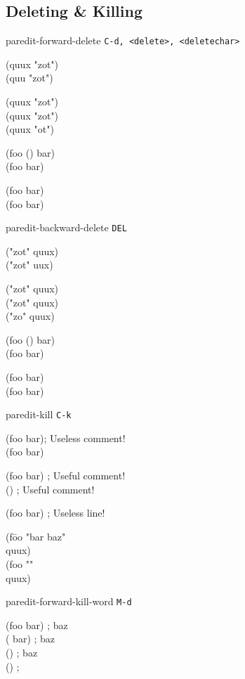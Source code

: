 \documentclass[8pt,landscape,a4paper]{article}
\newenvironment{nstabbing}
  {\setlength{\topsep}{-\parskip}%
   \setlength{\partopsep}{0.2em}%
   \tabbing}
  {\endtabbing}
\begin{document}
\begin{multicols}{4}
    \section*{Deleting \& Killing}

paredit-forward-delete \texttt{C-d, <delete>, <deletechar>}

{\ttfamily
(quu\cursor{}x "zot")\\
(quu\cursor{} "zot")

(quux \cursor"zot")\\
(quux "\cursor zot")\\
(quux "\cursor ot")

(foo (\cursor) bar)\\
(foo \cursor{} bar)

\cursor(foo bar)\\
(\cursor foo bar)
}

paredit-backward-delete \texttt{DEL}

{\ttfamily
("zot" q\cursor uux)\\
("zot" \cursor uux)

("zot"\cursor{} quux)\\
("zot\cursor" quux)\\
("zo\cursor" quux)

(foo (\cursor) bar)\\
(foo \cursor{} bar)

(foo bar)\cursor\\
(foo bar\cursor)
}

paredit-kill \texttt{C-k}

{\ttfamily
(foo bar)\cursor \space \space \space ; Useless comment!\\
(foo bar)\cursor

(\cursor foo bar) \space \space \space ; Useful comment!\\
(\cursor) \space \space \space ; Useful comment!

\cursor(foo bar) \space \space \space ; Useless line!\\
\cursor

\begin{nstabbing}
(f\=oo "\cursor bar baz"\\
\>quux)\\
(foo "\cursor"\\
\>quux)
\end{nstabbing}
}

paredit-forward-kill-word \texttt{M-d}

{\ttfamily
\cursor(foo bar) \space \space \space ; baz\\
(\cursor{} bar) \space \space \space ; baz\\
(\cursor) \space \space \space ; baz\\
() \space \space \space ;\cursor

}
\end{multicols}
\end{document}
